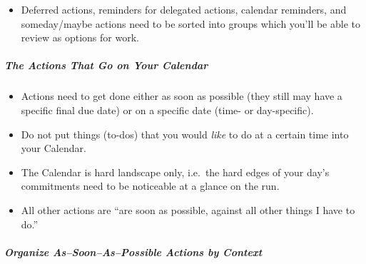 \documentclass{article}
\begin{document}
\begin{itemize}
  \item Deferred actions, reminders for delegated actions, calendar reminders, and someday/maybe actions need to be sorted into groups which you'll be able to review as options for work.
\end{itemize}

\subparagraph{The Actions That Go on Your Calendar}

\begin{itemize}
  \item Actions need to get done either as soon as possible (they still may have a specific final due date) or on a specific date (time- or day-specific).
  \item Do not put things (to-dos) that you would \emph{like} to do at a certain time into your Calendar.
  \item The Calendar is hard landscape only, i.e.\ the hard edges of your day's commitments need to be noticeable at a glance on the run.
  \item All other actions are ``are soon as possible, against all other things I have to do.''
\end{itemize}

\subparagraph{Organize As--Soon--As--Possible Actions by Context}
\end{document}
